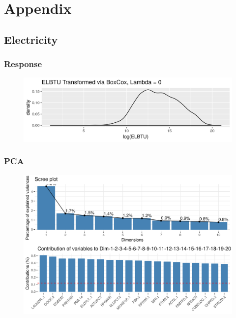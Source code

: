 \section*{Appendix}
\label{sec:appendix}

\appendix
\subsection{Electricity}
\subsubsection{Response}
\label{appendix:electricity:response}
\begin{figure}[h]
\includegraphics[width=\textwidth, height=0.2\textheight]{Images/electricity_response.png}
\centering
\end{figure}
\subsubsection{PCA}
\label{appendix:electricity:pca}
\begin{figure}[h]
\includegraphics[width=\textwidth, height=0.5\textheight]{Images/electricity_pca_vars.png}
\centering
\end{figure}
\newpage
